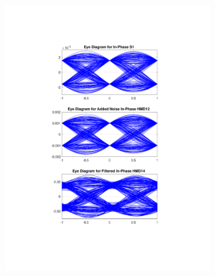\begin{figure}[H]
	\centering
	\begin{subfigure}{.45\textwidth}
		\centering
		\includegraphics[clip, trim=5cm 4cm 5cm 4cm, width=\textwidth]{./sdf/m_qam_system/figures/eyes/if_nn_p_60_03_rc.pdf}
	\end{subfigure}
	\begin{subfigure}{.45\textwidth}
		\centering

\end{subfigure}
\end{figure}
